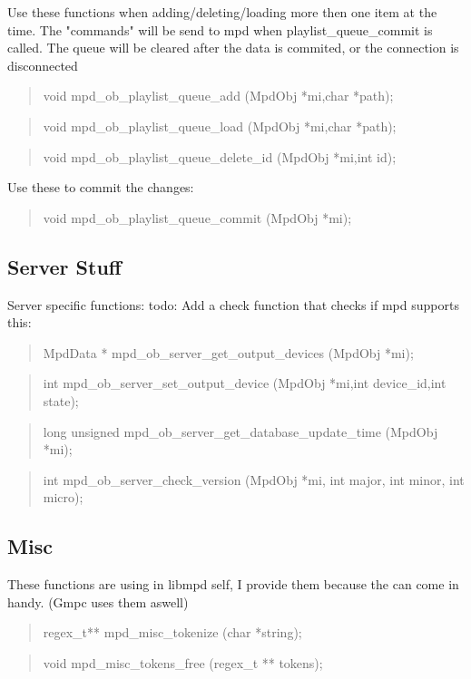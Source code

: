 \documentclass[a4paper,11pt]{article}
\begin{document}
Use these functions when adding/deleting/loading more then one item at the time.
The "commands" will be send to mpd when playlist\_queue\_commit is called.
The queue will be cleared after the data is commited, or the connection is disconnected

\begin{quote}
void 		mpd\_ob\_playlist\_queue\_add		(MpdObj *mi,char *path);
\end{quote}

\begin{quote}
void 		mpd\_ob\_playlist\_queue\_load		(MpdObj *mi,char *path);
\end{quote}
\begin{quote}
void 		mpd\_ob\_playlist\_queue\_delete\_id		(MpdObj *mi,int id);
\end{quote}

Use these to commit the changes:
\begin{quote}
void 		mpd\_ob\_playlist\_queue\_commit		(MpdObj *mi);
\end{quote}

\subsection{Server Stuff}

Server specific functions:
todo: Add a check function that checks if mpd supports this:
\begin{quote}
MpdData * 	mpd\_ob\_server\_get\_output\_devices	(MpdObj *mi);
\end{quote}

\begin{quote}
int 		mpd\_ob\_server\_set\_output\_device		(MpdObj *mi,int device\_id,int state);
\end{quote}
\begin{quote}
long unsigned	mpd\_ob\_server\_get\_database\_update\_time	(MpdObj *mi);
\end{quote}
\begin{quote}
int 		mpd\_ob\_server\_check\_version		(MpdObj *mi, int major, int minor, int micro);
\end{quote}

\subsection{Misc}


These functions are using in libmpd self, I provide them because the can come in handy.
(Gmpc uses them aswell)

\begin{quote}
regex\_t** 	mpd\_misc\_tokenize			(char *string);
\end{quote}

\begin{quote}
void 		mpd\_misc\_tokens\_free			(regex\_t ** tokens);
\end{quote}
\end{document}
